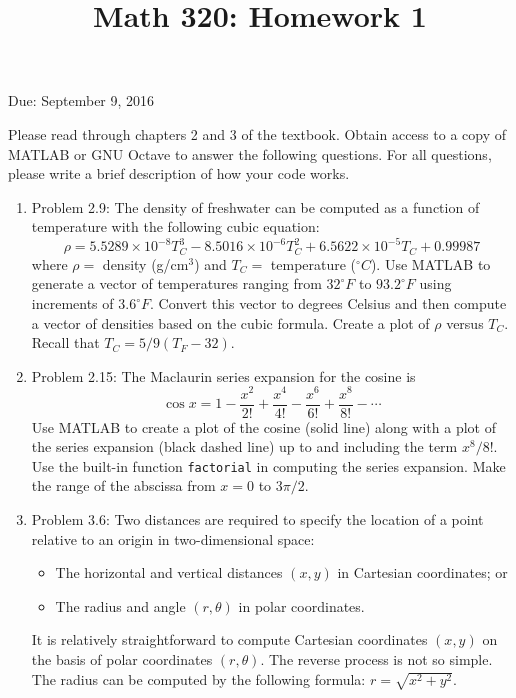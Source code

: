 \documentclass[12pt]{amsart}
\begin{document}
\title{Math 320: Homework 1}
Due: September 9, 2016
\maketitle

Please read through chapters 2 and 3 of the textbook.
Obtain access to a copy of MATLAB or GNU Octave to answer the
following questions. For all questions, please write a brief
description of how your code works.

\begin{enumerate}
\item Problem 2.9: The density of freshwater can be computed
as a function of temperature with the following cubic equation:
\[\rho = 5.5289 \times 10^{-8} T_C^3 - 8.5016 \times 10^{-6} T_C^2  +6.5622 \times 10^{-5} T_C + 0.99987\]
where $\rho =$ density (g/cm$^3$) and $T_C = $ temperature ($^\circ C$).
Use MATLAB to generate a vector of temperatures ranging from $32^\circ F$ to
$93.2 ^\circ F$ using increments of $3.6^\circ F$. Convert this vector to degrees Celsius
and then compute a vector of densities based on the cubic formula. Create a plot of
$\rho$ versus $T_C$. Recall that $T_C = 5/9 (T_F - 32)$.

\vspace{1cm}
\item Problem 2.15: The Maclaurin series expansion for the cosine is
\[ \cos x = 1 - \frac{x^2}{2!} + \frac{x^4}{4!} - \frac{x^6}{6!} + \frac{x^8}{8!} - \cdots \]
Use MATLAB to create a plot of the cosine (solid line) along with a 
plot of the series expansion (black dashed line) up to and including the term
$x^8/8!$. Use the built-in function {\tt factorial} in computing the series 
expansion. Make the range of the abscissa from $x = 0 $ to $3 \pi /2$.

\vspace{1cm}

\item Problem 3.6: Two distances are required to specify the location of a point
relative to an origin in two-dimensional space:
\begin{itemize}
\item The horizontal and vertical distances $(x,y)$ in Cartesian coordinates; or
\item The radius and angle $(r,\theta)$ in polar coordinates.
\end{itemize}
It is relatively straightforward to compute Cartesian coordinates $(x,y)$ on the 
basis of polar coordinates $(r,\theta)$. The reverse process is not so simple.
The radius can be computed by the following formula: $r = \sqrt{x^2 + y^2}$.


\end{enumerate}
\end{document}
